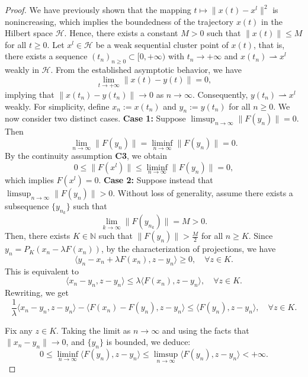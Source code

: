 \documentclass[hidelinks,11 pt]{article}
\numberwithin{equation}{section}
\theoremstyle{definition}  %
\numberwithin{equation}{section}
\numberwithin{theorem}{section}
\begin{document}
\begin{proof}
We have previously shown that the mapping \( t \mapsto \|x(t) - x^l\|^2 \) is nonincreasing, which implies the boundedness of the trajectory \( x(t) \) in the Hilbert space \( \mathcal{H} \). Hence, there exists a constant \( M > 0 \) such that \( \|x(t)\| \leq M \) for all \( t \geq 0 \).
\vskip 2mm 
Let \( x^l \in \mathcal{H} \) be a weak sequential cluster point of \( x(t) \), that is, there exists a sequence \( (t_n)_{n \geq 0} \subset [0, +\infty) \) with \( t_n \to +\infty \) and \( x(t_n) \rightharpoonup x^l \) weakly in \( \mathcal{H} \). From the established asymptotic behavior, we have
\[
\lim_{t \to +\infty} \|x(t) - y(t)\| = 0,
\]
implying that \( \|x(t_n) - y(t_n)\| \to 0 \) as \( n \to \infty \). Consequently, \( y(t_n) \rightharpoonup x^l \) weakly.
\vskip 2mm 
For simplicity, define \( x_n := x(t_n) \) and \( y_n := y(t_n) \) for all \( n \geq 0 \). We now consider two distinct cases.
\vskip 2mm
\textbf{Case 1:} Suppose \( \limsup_{n \to \infty} \|F(y_n)\| = 0 \). Then
\[
\lim_{n \to \infty} \|F(y_n)\| = \liminf_{n \to \infty} \|F(y_n)\| = 0.
\]
By the continuity assumption \textbf{C3}, we obtain
\[
0 \leq \|F(x^l)\| \leq \liminf_{n \to \infty} \|F(y_n)\| = 0,
\]
which implies \( F(x^l) = 0 \).
\vskip 2mm
\textbf{Case 2:} Suppose instead that \( \limsup_{n \to \infty} \|F(y_n)\| > 0 \). Without loss of generality, assume there exists a subsequence \( \{y_{n_k}\} \) such that
\[
\lim_{k \to \infty} \|F(y_{n_k})\| = M > 0.
\]
Then, there exists \( K \in \mathbb{N} \) such that \( \|F(y_n)\| > \frac{M}{2} \) for all \( n \geq K \). Since \( y_n = P_K(x_n - \lambda F(x_n)) \), by the characterization of projections, we have
\[
\langle y_n - x_n + \lambda F(x_n), z - y_n \rangle \geq 0, \quad \forall z \in K.
\]
This is equivalent to
\[
\langle x_n - y_n, z - y_n \rangle \leq \lambda \langle F(x_n), z - y_n \rangle, \quad \forall z \in K.
\]
Rewriting, we get
\[
\frac{1}{\lambda} \langle x_n - y_n, z - y_n \rangle - \langle F(x_n) - F(y_n), z - y_n \rangle \leq \langle F(y_n), z - y_n \rangle, \quad \forall z \in K.
\]

Fix any \( z \in K \). Taking the limit as \( n \to \infty \) and using the facts that \( \|x_n - y_n\| \to 0 \),  and \( \{y_n\} \) is bounded, we deduce:
\begin{equation} \label{ineq1}
    0 \leq \liminf_{n \to \infty} \langle F(y_n), z - y_n \rangle \leq \limsup_{n \to \infty} \langle F(y_n), z - y_n \rangle < +\infty.
\end{equation}


\end{proof}
\end{document}
